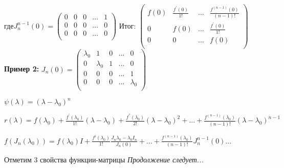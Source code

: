 \documentclass{article}
\begin{document}
    где\( J_{n}^{n-1}(0) = \begin{pmatrix}
0 & 0 & 0 & ... & 1 \\
0 & 0 & 0 & ... & 0 \\
0 & 0 & 0 & ... & 0 \\
\end{pmatrix}\)
\newline\newline\newline
Итог:
\(\begin{pmatrix}
f(0) & \frac{f^{'}(0)}{1!} & ... & \frac{f^{(n-1)} (0)}{(n-1)!} \\
0 & f(0) & ... &  \frac{f^{'}(0)}{1!}  \\
0 & 0 & ... & f(0)  \\
\end{pmatrix}\)
\newline\newline\newline\newline\newline
\textbf{Пример 2:}\newline
\(J_{n} (0) = \begin{pmatrix}
    \lambda_{0} & 1 & 0 & ... & 0 \\
    0 & \lambda_{0} & 1 & ... & 0 \\
    0 & 0 & 0 & ... & 1 \\
    0 & 0 & 0 & ... & \lambda_{0} \\
    \end{pmatrix}\)

\newline

  \(  \psi (\lambda) = (\lambda - \lambda_{0})^{n}\)\newline
  
  \(  r({\lambda}) = f(\lambda_{0}) + \frac{f^{'}(\lambda_{0})}{1!}(\lambda - \lambda_{0}) +\frac{f^{''}(\lambda_{0})}{2!}(\lambda - \lambda_{0})^{2} + ... + \frac{f^{(n-1)}(\lambda_{0})}{(n-1)!}(\lambda - \lambda_{0})^{n-1}\)\newline
    
   \( f(J_{n}(\lambda_{0})) = f(\lambda_{0})I + \frac{f^{i}(\lambda_{0})}{1!} \frac{J_{n}\lambda_{0} - \lambda_{0}I_{n}}{J_n(0)} + ... + \frac{f^{(n-1)}(\lambda_{0})}{(n-1)!} J_{n}^{n-1}(0)... \)\newline
    
    Отметим 3 свойства функции-матрицы \newline
    \textit{Продолжение следует...}\newline
\end{document}
